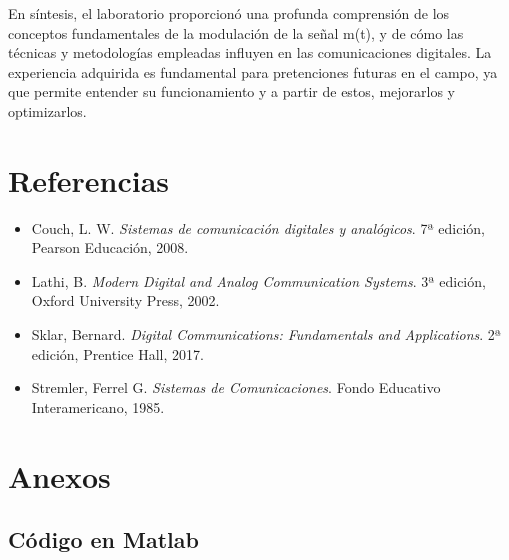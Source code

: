 \documentclass[12pt]{article}
\begin{document}
En síntesis, el laboratorio proporcionó una profunda comprensión de los conceptos fundamentales de la modulación de la señal m(t), y de cómo las técnicas y metodologías empleadas influyen en las comunicaciones digitales. La experiencia adquirida es fundamental para pretenciones futuras en el campo, ya que permite entender su funcionamiento y a partir de estos, mejorarlos y optimizarlos. 

\newpage
\section{Referencias}

\begin{itemize}
    \item Couch, L. W. \textit{Sistemas de comunicación digitales y analógicos}. 7ª edición, Pearson Educación, 2008.
    
    \item Lathi, B. \textit{Modern Digital and Analog Communication Systems}. 3ª edición, Oxford University Press, 2002.
    
    \item Sklar, Bernard. \textit{Digital Communications: Fundamentals and Applications}. 2ª edición, Prentice Hall, 2017.
    
    \item Stremler, Ferrel G. \textit{Sistemas de Comunicaciones}. Fondo Educativo Interamericano, 1985.
\end{itemize}



\newpage
\section{Anexos}

\subsection*{Código en Matlab}
\end{document}
